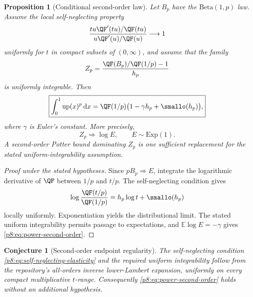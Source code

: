 \documentclass[11pt,oneside]{article}
\newtheorem{proposition}[theorem]{Proposition}
\newtheorem{conjecture}[theorem]{Conjecture}
\theoremstyle{definition}
\theoremstyle{remark}
\newcommand{\Up}{\operatorname{up}}
\newcommand{\E}{\mathbb E}
\newcommand{\dd}{\,\mathrm d}
\newcommand{\1}{\mathbf 1}
\begin{document}
\begin{proposition}[Conditional second-order law]
\label{p8:prop:power-second-order}
Let \(B_p\) have the \(\mathrm{Beta}(1,p)\) law.  Assume the local
self-neglecting property
\begin{equation}
 \frac{tu\QF'(tu)/\QF(tu)}{u\QF'(u)/\QF(u)}\longrightarrow1
 \label{p8:eq:self-neglecting-elasticity}
\end{equation}
uniformly for \(t\) in compact subsets of \((0,\infty)\), and assume that
the family
\begin{equation}
 Z_p=\frac{\QF(B_p)/\QF(1/p)-1}{h_p}
 \label{p8:eq:Zp}
\end{equation}
is uniformly integrable.  Then
\begin{equation}
 \boxed{
 \int_0^1\Up(x)^p\dd x
 =\QF(1/p)\bigl(1-\gamma h_p+\smallo(h_p)\bigr),}
 \label{p8:eq:power-second-order}
\end{equation}
where \(\gamma\) is Euler's constant.  More precisely,
\begin{equation}
 Z_p\Longrightarrow \log E,
 \qquad E\sim\mathrm{Exp}(1).
 \label{p8:eq:power-logexp-limit}
\end{equation}
A second-order Potter bound dominating \(Z_p\) is one sufficient replacement
for the stated uniform-integrability assumption.  \statusconditional
\end{proposition}

\begin{proof}[Proof under the stated hypotheses]
Since \(pB_p\Rightarrow E\), integrate the logarithmic derivative of \(\QF\)
between \(1/p\) and \(t/p\).  The self-neglecting condition gives
\[
 \log\frac{\QF(t/p)}{\QF(1/p)}=h_p\log t+\smallo(h_p)
\]
locally uniformly.  Exponentiation yields the distributional limit.  The stated
uniform integrability permits passage to expectations, and
\(\E\log E=-\gamma\) gives \eqref{p8:eq:power-second-order}.
\end{proof}

\begin{conjecture}[Second-order endpoint regularity]
The self-neglecting condition \eqref{p8:eq:self-neglecting-elasticity} and the
required uniform integrability follow from the repository's all-orders inverse
lower-Lambert expansion, uniformly on every compact multiplicative \(t\)-range.
Consequently \eqref{p8:eq:power-second-order} holds without an additional
hypothesis.
\statusconjecture
\end{conjecture}

\end{document}
